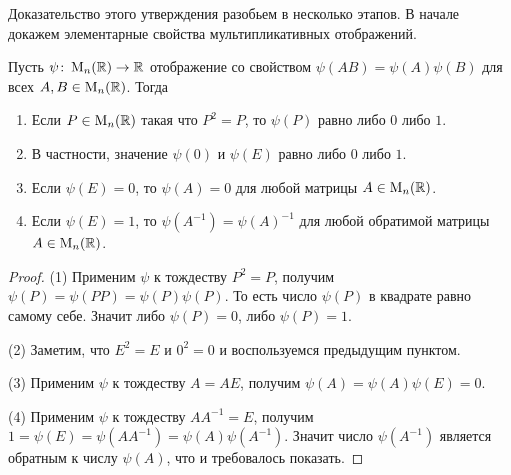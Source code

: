 Доказательство этого утверждения разобьем в несколько этапов. В начале докажем элементарные свойства мультипликативных отображений.

\begin{claim}
Пусть $\psi\colon \operatorname{M}_{n}(\mathbb R)\to \mathbb R$ отображение со свойством $\psi(AB) = \psi(A)\psi(B)$ для всех $A,B\in\operatorname{M}_{n}(\mathbb R)$. Тогда
\begin{enumerate}
\item Если $P\in \operatorname{M}_{n}(\mathbb R)$ такая что $P^2 = P$, то $\psi(P)$ равно либо $0$ либо $1$.

\item В частности, значение $\psi(0)$ и $\psi(E)$ равно либо $0$ либо $1$.

\item Если $\psi(E) = 0$, то $\psi(A) = 0$ для любой матрицы $A\in\operatorname{M}_{n}(\mathbb R)$.

\item Если $\psi(E) = 1$, то $\psi(A^{-1}) = \psi(A)^{-1}$ для любой обратимой матрицы $A\in\operatorname{M}_{n}(\mathbb R)$.
\end{enumerate}
\end{claim}
\begin{proof}

(1) Применим $\psi$ к тождеству $P^2 = P$, получим $\psi(P) = \psi(P P) = \psi(P)\psi(P)$. То есть число $\psi(P)$ в квадрате равно самому себе. Значит либо $\psi(P) = 0$, либо $\psi(P) = 1$.

(2) Заметим, что $E^2 = E$ и $0^2 = 0$ и воспользуемся предыдущим пунктом.

(3) Применим $\psi$ к тождеству $A = A E$, получим $\psi(A) = \psi(A)\psi(E) = 0$.

(4) Применим $\psi$ к тождеству $A A^{-1} = E$, получим $1 = \psi(E) = \psi(AA^{-1})=\psi(A)\psi(A^{-1})$. Значит число $\psi(A^{-1})$ является обратным к числу $\psi(A)$, что и требовалось показать.
\end{proof}

